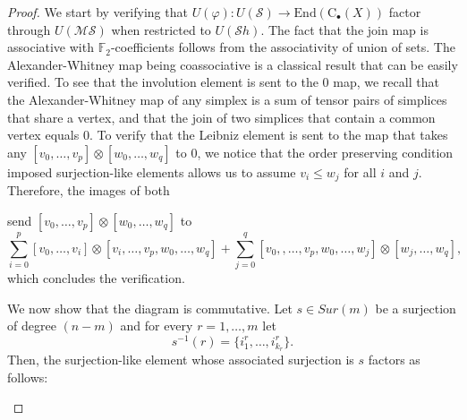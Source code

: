 \documentclass{amsart}
\renewcommand{\S}{\mathcal{S}}
\newcommand{\MS}{\mathcal{MS}}
\newcommand{\Sh}{\mathcal{S}h}
\newcommand{\F}{\mathbb{F}}
\newcommand{\chains}{\mathrm{C}_\bullet}
\newcommand{\tensor}{\otimes}
\newcommand{\End}{\mathrm{End}}
\theoremstyle{definition}
\begin{document}
	\begin{proof}
		We start by verifying that $U(\varphi) : U(\S) \to \End(\chains(X))$ factor through $U(\MS)$ when restricted to $U(\Sh)$. The fact that the join map is associative with $\F_2$-coefficients follows from the associativity of union of sets. The Alexander-Whitney map being coassociative is a classical result that can be easily verified. To see that the involution element is sent to the 0 map, we recall that the Alexander-Whitney map of any simplex is a sum of tensor pairs of simplices that share a vertex, and that the join of two simplices that contain a common vertex equals $0$. To verify that the Leibniz element is sent to the map that takes any $[v_0,\dots,v_p]\tensor[w_0,\dots,w_q]$ to $0$, we notice that the order preserving condition imposed surjection-like elements allows us to assume $v_i\leq w_j$ for all $i$ and $j$. Therefore, the images of both
		\begin{center}
		\end{center}
		send $[v_0,\dots,v_p]\tensor[w_0,\dots,w_q]$ to  
		\begin{equation*}
		\sum_{i=0}^p[v_0,\dots,v_i]\tensor[v_i,\dots,v_p,w_0,\dots,w_q]+\sum_{j=0}^q[v_0,,\dots,v_p,w_0,\dots,w_j]\tensor[w_j,\dots,w_q],
		\end{equation*}
		which concludes the verification.
		
		We now show that the diagram is commutative. Let $s\in Sur(m)$ be a surjection of degree $(n-m)$ and for every $r = 1,\dots,m$ let 
		\begin{equation*}
		s^{-1}(r) = \{i^r_1,\dots,i^r_{k_r}\}.
		\end{equation*}
		Then, the surjection-like element whose associated surjection is $s$ factors as follows:
		\begin{center}
\end{center}
\end{proof}
\end{document}
